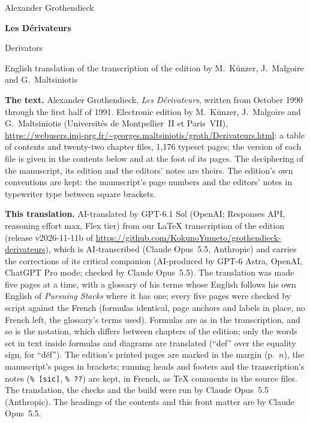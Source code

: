 \documentclass[11pt,oneside]{article}
\begin{document}
\pagestyle{plain}
\begin{titlepage}
\centering
\vspace*{0.22\textheight}
{\Large Alexander Grothendieck\par}
\vspace{2em}
{\Huge\bfseries Les Dérivateurs\par}
\vspace{1em}
{\Large Derivators\par}
\vspace{2em}
{\large English translation of the transcription of the edition by M.~Künzer, J.~Malgoire and G.~Maltsiniotis\par}
\vfill
\end{titlepage}
\noindent\textbf{The text.} Alexander Grothendieck, \emph{Les Dérivateurs}, written from October 1990 through the
first half of 1991. Electronic edition by M.~Künzer, J.~Malgoire and G.~Maltsiniotis (Universités de Montpellier~II et
Paris~VII), \url{https://webusers.imj-prg.fr/~georges.maltsiniotis/groth/Derivateurs.html}: a table of contents and twenty-two chapter files, 1,176 typeset pages; the version
of each file is given in the contents below and at the foot of its pages. The deciphering of the manuscript, its edition
and the editors' notes are theirs. The edition's own conventions are kept: the manuscript's page numbers and the
editors' notes in typewriter type between square brackets.

\medskip
\noindent\textbf{This translation.} AI-translated by GPT-6.1 Sol (OpenAI; Responses API, reasoning effort max, Flex
tier) from our LaTeX transcription of the edition (release v2026-11-11b of
\url{https://github.com/KokunoYumeto/grothendieck-derivateurs}), which is AI-transcribed (Claude Opus~5.5, Anthropic)
and carries the corrections of its critical companion (AI-produced by GPT-6 Astra, OpenAI, ChatGPT Pro mode; checked
by Claude Opus~5.5). The translation was made five pages at a time, with a glossary of his terms whose English follows
his own English of \emph{Pursuing Stacks} where it has one; every five pages were checked by script against the French
(formulas identical, page anchors and labels in place, no French left, the glossary's terms used). Formulas are as in
the transcription, and so is the notation, which differs between chapters of the edition; only the words set in text
inside formulas and diagrams are translated (``def'' over the equality sign, for ``déf''). The edition's printed pages
are marked in the margin (p.~$n$), the manuscript's pages in brackets; running heads and footers and the transcription's
notes (\texttt{\%~[sic]}, \texttt{\%~??}) are kept, in French, as \TeX{} comments in the source files. The
translation, the checks and the build were run by Claude Opus~5.5 (Anthropic). The headings of the contents and this
front matter are by Claude Opus~5.5.
\end{document}
